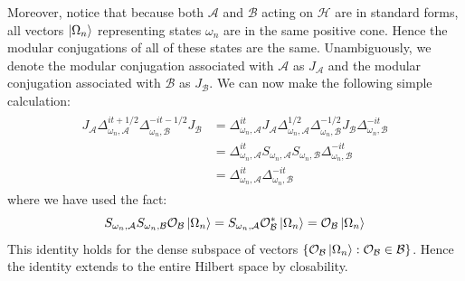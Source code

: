 \documentclass[a4paper,11pt]{article}
\theoremstyle{definition}
\begin{document}
Moreover, notice that because both $\mathcal{A}$ and $\mathcal{B}$ acting on $\mathcal{H}$ are in standard forms, all vectors $\ket{\Omega_n}$ representing states $\omega_n$ are in the same positive cone. Hence the modular conjugations of all of these states are the same. Unambiguously, we denote the modular conjugation associated with $\mathcal{A}$ as $J_\mathcal{A}$ and the modular conjugation associated with $\mathcal{B}$ as $J_\mathcal{B}$. We can now make the following simple calculation:
\begin{align}
    \begin{split}
        J_\mathcal{A}\Delta_{\omega_n,\mathcal{A}}^{it + 1/2}\Delta_{\omega_n,\mathcal{B}}^{-it - 1/2}J_\mathcal{B} &= \Delta_{\omega_n, \mathcal{A}}^{it}J_\mathcal{A}\Delta_{\omega_n, \mathcal{A}}^{1/2}\Delta_{\omega_n,\mathcal{B}}^{-1/2}J_\mathcal{B}\Delta_{\omega_n,\mathcal{B}}^{-it}
        \\&=\Delta_{\omega_n, \mathcal{A}}^{it}S_{\omega_n,\mathcal{A}}S_{\omega_n,\mathcal{B}}\Delta_{\omega_n,\mathcal{B}}^{-it}
        \\& = \Delta_{\omega_n,\mathcal{A}}^{it}\Delta_{\omega_n,\mathcal{B}}^{-it}
    \end{split}
\end{align}
where we have used the fact:
\begin{equation}
    S_{\omega_n,\mathcal{A}}S_{\omega_n,\mathcal{B}}\mathcal{O}_\mathcal{B}\ket{\Omega_n} = S_{\omega_n,\mathcal{A}}\mathcal{O}^*_\mathcal{B}\ket{\Omega_n} = \mathcal{O}_\mathcal{B}\ket{\Omega_n}
\end{equation}
This identity holds for the dense subspace of vectors $\{\mathcal{O}_\mathcal{B}\ket{\Omega_n}:\mathcal{O}_\mathcal{B}\in\mathcal{B}\}$. Hence the identity extends to the entire Hilbert space by closability.
\end{document}
